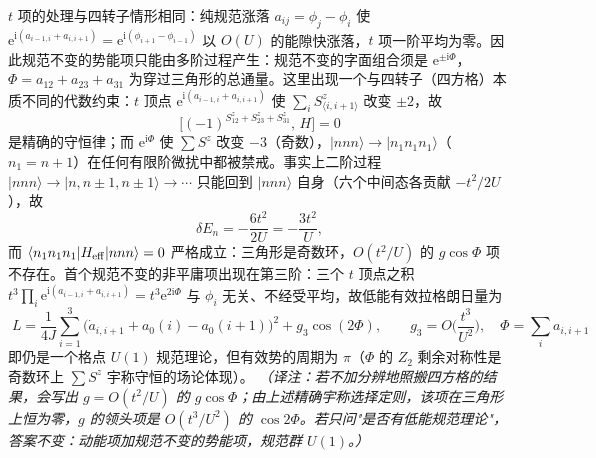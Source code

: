 $t$ 项的处理与四转子情形相同：纯规范涨落 $a_{ij}=\phi_j-\phi_i$ 使 $\mathrm e^{\mathrm i(a_{i-1,i}+a_{i,i+1})}=\mathrm e^{\mathrm i(\phi_{i+1}-\phi_{i-1})}$ 以 $O(U)$ 的能隙快涨落，$t$ 项一阶平均为零。因此规范不变的势能项只能由多阶过程产生：规范不变的字面组合须是 $\mathrm e^{\pm\mathrm i\Phi}$，$\Phi=a_{12}+a_{23}+a_{31}$ 为穿过三角形的总通量。这里出现一个与四转子（四方格）本质不同的代数约束：$t$ 顶点 $\mathrm e^{\mathrm i(a_{i-1,i}+a_{i,i+1})}$ 使 $\sum_i S_{\langle i,i+1\rangle}^{z}$ 改变 $\pm2$，故
\begin{equation*}
\big[(-1)^{S_{12}^{z}+S_{23}^{z}+S_{31}^{z}},\,H\big]=0
\end{equation*}
是精确的守恒律；而 $\mathrm e^{\mathrm i\Phi}$ 使 $\sum S^{z}$ 改变 $-3$（奇数），$|nnn\rangle\to|n_1n_1n_1\rangle$（$n_1=n+1$）在任何有限阶微扰中都被禁戒。事实上二阶过程 $|nnn\rangle\to|n,n\pm1,n\pm1\rangle\to\cdots$ 只能回到 $|nnn\rangle$ 自身（六个中间态各贡献 $-t^{2}/2U$），故
\begin{equation*}
\delta E_n=-\frac{6t^{2}}{2U}=-\frac{3t^{2}}{U},
\end{equation*}
而 $\langle n_1n_1n_1|H_{\rm eff}|nnn\rangle=0$ 严格成立：三角形是奇数环，$O(t^{2}/U)$ 的 $g\cos\Phi$ 项不存在。首个规范不变的非平庸项出现在第三阶：三个 $t$ 顶点之积 $t^{3}\prod_{i}\mathrm e^{\mathrm i(a_{i-1,i}+a_{i,i+1})}=t^{3}\mathrm e^{2\mathrm i\Phi}$ 与 $\phi_i$ 无关、不经受平均，故低能有效拉格朗日量为
\begin{equation*}
\boxed{\;L=\frac{1}{4J}\sum_{i=1}^{3}\big(\dot a_{i,i+1}+a_0(i)-a_0(i+1)\big)^{2}+g_{3}\cos(2\Phi),
\qquad g_{3}=O\!\Big(\frac{t^{3}}{U^{2}}\Big),\quad \Phi=\sum_i a_{i,i+1}\;}
\end{equation*}
即仍是一个格点 $U(1)$ 规范理论，但有效势的周期为 $\pi$（$\Phi$ 的 $Z_2$ 剩余对称性是奇数环上 $\sum S^{z}$ 宇称守恒的场论体现）。
\emph{（译注：若不加分辨地照搬四方格的结果，会写出 $g=O(t^{2}/U)$ 的 $g\cos\Phi$；由上述精确宇称选择定则，该项在三角形上恒为零，$g$ 的领头项是 $O(t^{3}/U^{2})$ 的 $\cos2\Phi$。若只问"是否有低能规范理论"，答案不变：动能项加规范不变的势能项，规范群 $U(1)$。）}

